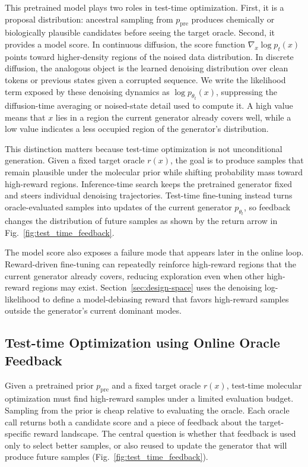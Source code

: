 \documentclass{article}
\begin{document}
This pretrained model plays two roles in test-time optimization. First, it is a proposal distribution: ancestral sampling from $p_{\mathrm{pre}}$ produces chemically or biologically plausible candidates before seeing the target oracle. Second, it provides a model score. In continuous diffusion, the score function $\nabla_x \log p_t(x)$ points toward higher-density regions of the noised data distribution. In discrete diffusion, the analogous object is the learned denoising distribution over clean tokens or previous states given a corrupted sequence. We write the likelihood term exposed by these denoising dynamics as $\log p_{\theta_t}(x)$, suppressing the diffusion-time averaging or noised-state detail used to compute it. A high value means that $x$ lies in a region the current generator already covers well, while a low value indicates a less occupied region of the generator's distribution.

This distinction matters because test-time optimization is not unconditional generation. Given a fixed target oracle $r(x)$, the goal is to produce samples that remain plausible under the molecular prior while shifting probability mass toward high-reward regions. Inference-time search keeps the pretrained generator fixed and steers individual denoising trajectories. Test-time fine-tuning instead turns oracle-evaluated samples into updates of the current generator $p_{\theta_t}$, so feedback changes the distribution of future samples as shown by the return arrow in Fig.~\ref{fig:test_time_feedback}.

The model score also exposes a failure mode that appears later in the online loop. Reward-driven fine-tuning can repeatedly reinforce high-reward regions that the current generator already covers, reducing exploration even when other high-reward regions may exist. Section~\ref{sec:design-space} uses the denoising log-likelihood to define a model-debiasing reward that favors high-reward samples outside the generator's current dominant modes.



\subsection{Test-time Optimization using Online Oracle Feedback}

Given a pretrained prior $p_{\mathrm{pre}}$ and a fixed target oracle $r(x)$, test-time molecular optimization must find high-reward samples under a limited evaluation budget. Sampling from the prior is cheap relative to evaluating the oracle. Each oracle call returns both a candidate score and a piece of feedback about the target-specific reward landscape. The central question is whether that feedback is used only to select better samples, or also reused to update the generator that will produce future samples (Fig.~\ref{fig:test_time_feedback}).
\end{document}
